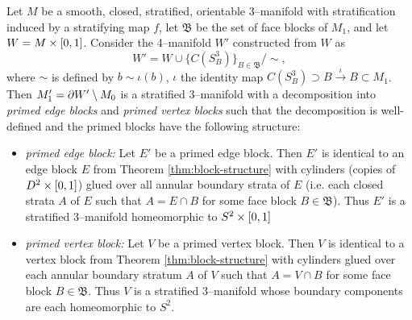 \begin{theorem}
	Let $M$ be a smooth, closed, stratified, orientable 3--manifold with stratification induced by a stratifying map $f$, let $\mathfrak{B}$ be the set of face blocks of $M_1$, and let $W=M\times[0,1]$.
	Consider the 4--manifold $W'$ constructed from $W$ as
	\[
		W' = W\cup\{C(S_B^3)\}_{B\in \mathfrak{B}} / \sim,
	\]
	where $\sim$ is defined by $b\sim \iota(b)$, $\iota$ the identity map $C(S_B^3)\supset B\overset{\iota}{\to} B\subset M_1$.
	Then $M_1'=\partial W'\setminus M_0$ is a stratified 3--manifold with a decomposition into \emph{primed edge blocks} and \emph{primed vertex blocks} such that the decomposition is well-defined and the primed blocks have the following structure:
	\begin{itemize}
		\item \emph{primed edge block:}
		Let $E'$ be a primed edge block.
		Then $E'$ is identical to an edge block $E$ from Theorem \ref{thm:block-structure} with cylinders (copies of $D^2\times[0,1]$) glued over all annular boundary strata of $E$ (i.e. each closed strata $A$ of $E$ such that $A=E\cap B$ for some face block $B\in\mathfrak{B}$).
		Thus $E'$ is a stratified 3--manifold homeomorphic to $S^2\times[0,1]$
		
		\item \emph{primed vertex block:}
		Let $V$ be a primed vertex block.
		Then $V$ is identical to a vertex block from Theorem \ref{thm:block-structure} with cylinders glued over each annular boundary stratum $A$ of $V$ such that $A=V\cap B$ for some face block $B\in\mathfrak{B}$.
		Thus $V$ is a stratified 3--manifold whose boundary components are each homeomorphic to $S^2$.
	\end{itemize}
\end{theorem}

